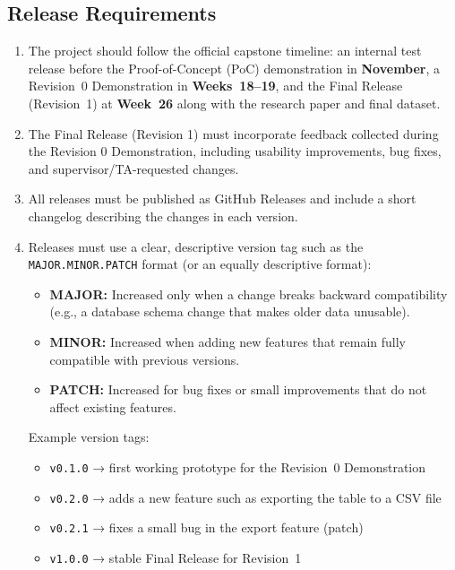 \documentclass[12pt]{article}
\begin{document}
\subsection{Release Requirements}
\begin{enumerate}[label=OE-RR\arabic*]
\item The project should follow the official capstone timeline: an internal test release before the Proof-of-Concept (PoC) demonstration in \textbf{November}, a Revision~0 Demonstration in \textbf{Weeks~18--19}, and the Final Release (Revision~1) at \textbf{Week~26} along with the research paper and final dataset.
\item The Final Release (Revision 1) must incorporate feedback collected during the Revision 0 Demonstration, including usability improvements, bug fixes, and supervisor/TA-requested changes.
\item All releases must be published as GitHub Releases and include a short changelog describing the changes in each version.

  \item Releases must use a clear, descriptive version tag such as the \texttt{MAJOR.MINOR.PATCH} format (or an equally descriptive format):
    \begin{itemize}
        \item \textbf{MAJOR:} Increased only when a change breaks backward compatibility (e.g., a database schema change that makes older data unusable).
        \item \textbf{MINOR:} Increased when adding new features that remain fully compatible with previous versions.
        \item \textbf{PATCH:} Increased for bug fixes or small improvements that do not affect existing features.
    \end{itemize}

  Example version tags:
    \begin{itemize}
        \item \texttt{v0.1.0} → first working prototype for the Revision~0 Demonstration
        \item \texttt{v0.2.0} → adds a new feature such as exporting the table to a CSV file
        \item \texttt{v0.2.1} → fixes a small bug in the export feature (patch)
        \item \texttt{v1.0.0} → stable Final Release for Revision~1
    \end{itemize}
\end{enumerate}
\end{document}
